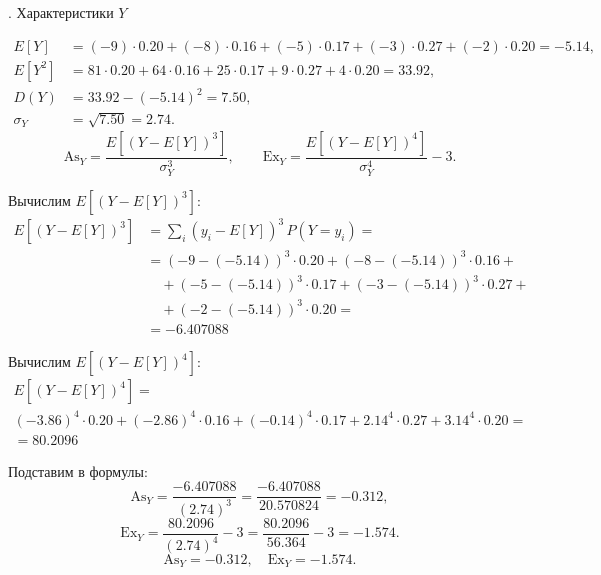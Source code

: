 \documentclass[a4paper,14pt]{extarticle}
\begin{document}
            . Характеристики $Y$
            
            \[
                \begin{aligned}
                    E[Y] &= (-9)\cdot0.20 + (-8)\cdot0.16 + (-5)\cdot0.17 + (-3)\cdot0.27 + (-2)\cdot0.20 = -5.14,\\
                    E[Y^2] &= 81\cdot0.20 + 64\cdot0.16 + 25\cdot0.17 + 9\cdot0.27 + 4\cdot0.20 = 33.92,\\
                    D(Y) &= 33.92 - (-5.14)^2 = 7.50,\\
                    \sigma_Y &= \sqrt{7.50} = 2.74.
                \end{aligned}
            \]
            \[
                \mathrm{As}_Y = \frac{E[(Y - E[Y])^3]}{\sigma_Y^3},
                \qquad
                \mathrm{Ex}_Y = \frac{E[(Y - E[Y])^4]}{\sigma_Y^4} - 3.
            \]
            
            Вычислим $E[(Y - E[Y])^3]$:
            \[
                \begin{aligned}
                    E[(Y - E[Y])^3] &= \sum_i (y_i - E[Y])^3 \, P(Y=y_i) = \\
                    &= (-9 - (-5.14))^3 \cdot 0.20 + (-8 - (-5.14))^3 \cdot 0.16 + \\
                    &\quad + (-5 - (-5.14))^3 \cdot 0.17 + (-3 - (-5.14))^3 \cdot 0.27 + \\
                    &\quad + (-2 - (-5.14))^3 \cdot 0.20 = \\
                    & = -6.407088
                \end{aligned}
            \]
            
            Вычислим $E[(Y - E[Y])^4]$:
            \begin{gather*}
                E[(Y - E[Y])^4] = \\
                (-3.86)^4 \cdot 0.20 + (-2.86)^4 \cdot 0.16 + (-0.14)^4 \cdot 0.17 + 2.14^4 \cdot 0.27 + 3.14^4 \cdot 0.20 = \\
                = 80.2096
            \end{gather*}
            
            Подставим в формулы:
            \[
                \mathrm{As}_Y = \frac{-6.407088}{(2.74)^3} = \frac{-6.407088}{20.570824} = -0.312,
            \]
            \[
                \mathrm{Ex}_Y = \frac{ 80.2096}{(2.74)^4} - 3 = \frac{ 80.2096}{56.364} - 3 = -1.574.
            \]
            \[
                \boxed{\mathrm{As}_Y = -0.312, \quad \mathrm{Ex}_Y = -1.574.}
            \]
            
\end{document}
